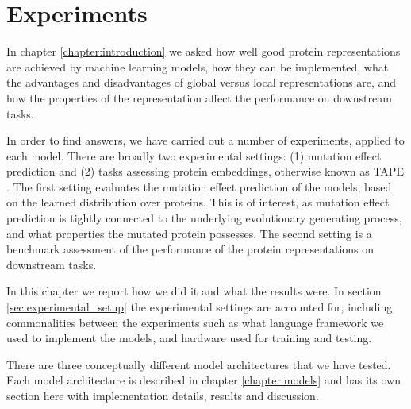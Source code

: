 \chapter{Experiments}
\label{chapter:experiments}

In chapter \ref{chapter:introduction} we asked how well good protein representations are achieved by machine learning models, how they can be implemented, what the advantages and disadvantages of global versus local representations are, and how the properties of the representation affect the performance on downstream tasks.

In order to find answers, we have carried out a number of experiments, applied to each model. There are broadly two experimental settings: (1) mutation effect prediction and (2) tasks assessing protein embeddings, otherwise known as TAPE \cite{rao2019evaluating}. The first setting evaluates the mutation effect prediction of the models, based on the learned distribution over proteins. This is of interest, as mutation effect prediction is tightly connected to the underlying evolutionary generating process, and what properties the mutated protein possesses. The second setting is a benchmark assessment of the performance of the protein representations on downstream tasks.

In this chapter we report how we did it and what the results were. In section \ref{sec:experimental_setup} the experimental settings are accounted for, including commonalities between the experiments such as what language framework we used to implement the models, and hardware used for training and testing. 

There are three conceptually different model architectures that we have tested. Each model architecture is described in chapter \ref{chapter:models} and has its own section here with implementation details, results and discussion.




